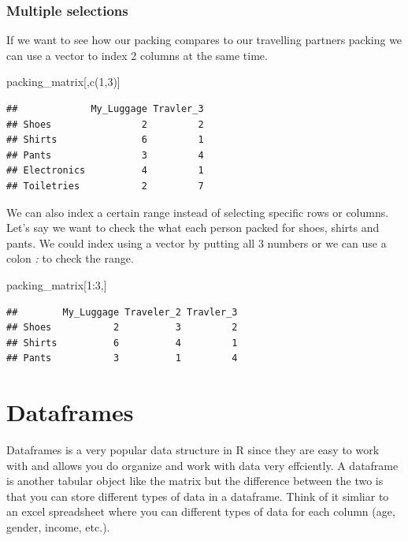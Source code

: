 \documentclass[
]{book}
\newenvironment{Shaded}{\begin{snugshade}}{\end{snugshade}}
\newcommand{\DecValTok}[1]{\textcolor[rgb]{0.00,0.00,0.81}{#1}}
\newcommand{\FunctionTok}[1]{\textcolor[rgb]{0.00,0.00,0.00}{#1}}
\newcommand{\NormalTok}[1]{#1}
\newcommand{\SpecialCharTok}[1]{\textcolor[rgb]{0.00,0.00,0.00}{#1}}
\begin{document}
\hypertarget{multiple-selections}{%
\subsubsection{Multiple selections}\label{multiple-selections}}

If we want to see how our packing compares to our travelling partners packing we can use a vector to index 2 columns at the same time.

\begin{Shaded}
\begin{Highlighting}[]
\NormalTok{packing\_matrix[,}\FunctionTok{c}\NormalTok{(}\DecValTok{1}\NormalTok{,}\DecValTok{3}\NormalTok{)]}
\end{Highlighting}
\end{Shaded}

\begin{verbatim}
##             My_Luggage Travler_3
## Shoes                2         2
## Shirts               6         1
## Pants                3         4
## Electronics          4         1
## Toiletries           2         7
\end{verbatim}

We can also index a certain range instead of selecting specific rows or columns. Let's say we want to check the what each person packed for shoes, shirts and pants. We could index using a vector by putting all 3 numbers or we can use a colon \emph{:} to check the range.

\begin{Shaded}
\begin{Highlighting}[]
\NormalTok{packing\_matrix[}\DecValTok{1}\SpecialCharTok{:}\DecValTok{3}\NormalTok{,]}
\end{Highlighting}
\end{Shaded}

\begin{verbatim}
##        My_Luggage Traveler_2 Travler_3
## Shoes           2          3         2
## Shirts          6          4         1
## Pants           3          1         4
\end{verbatim}

\hypertarget{dataframes}{%
\section{Dataframes}\label{dataframes}}

Dataframes is a very popular data structure in R since they are easy to work with and allows you do organize and work with data very effciently. A dataframe is another tabular object like the matrix but the difference between the two is that you can store different types of data in a dataframe. Think of it simliar to an excel spreadsheet where you can different types of data for each column (age, gender, income, etc.).
\end{document}
